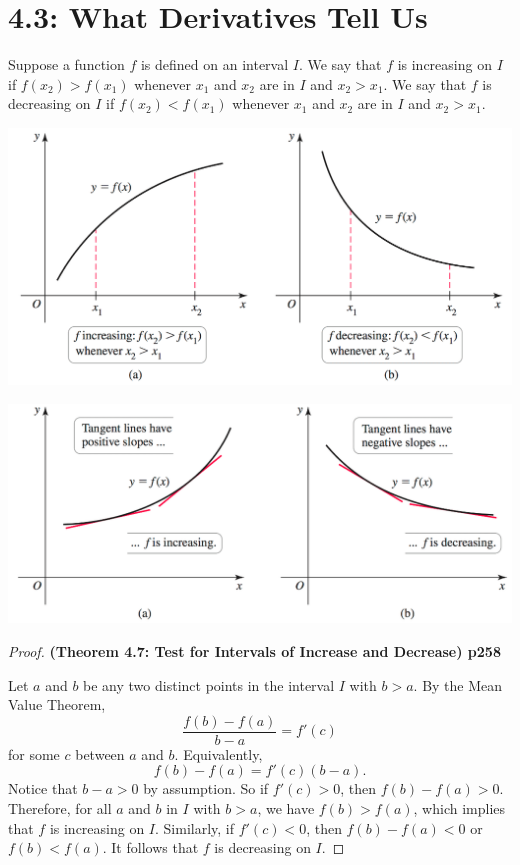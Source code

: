 \documentclass[mathNotesPreamble]{subfiles}
\begin{document}
\section{4.3: What Derivatives Tell Us}
\begin{defn*}
  Suppose a function $f$ is defined on an interval $I$. We say that $f$ is increasing on $I$ if $f(x_2)>f(x_1)$ whenever $x_1$ and $x_2$ are in $I$ and $x_2>x_1$. We say that $f$ is decreasing on $I$ if $f(x_2)<f(x_1)$ whenever $x_1$ and $x_2$ are in $I$ and $x_2>x_1$.
\end{defn*}
\begin{center}
  \includegraphics[width=0.65\linewidth]{images/briggs_04_03/fig4_20.png}
\end{center}

\noindent
{}
\begin{center}
  \includegraphics[width=0.65\linewidth]{images/briggs_04_03/fig4_21.png}
\end{center}
\pagebreak
\begin{proof}
  \textbf{(Theorem 4.7: Test for Intervals of Increase and Decrease) p258}

  Let $a$ and $b$ be any two distinct points in the interval $I$ with $b>a$. By the Mean Value Theorem, 
    $$\frac{f(b)-f(a)}{b-a}=f'(c)$$
  for some $c$ between $a$ and $b$. Equivalently,
    $$f(b)-f(a)=f'(c)(b-a).$$
  Notice that $b-a>0$ by assumption. So if $f'(c)>0$, then $f(b)-f(a)>0$. Therefore, for all $a$ and $b$ in $I$ with $b>a$, we have $f(b)>f(a)$, which implies that $f$ is increasing on $I$. Similarly, if $f'(c)<0$, then $f(b)-f(a)<0$ or $f(b)<f(a)$. It follows that $f$ is decreasing on $I$.
\end{proof}
\end{document}
